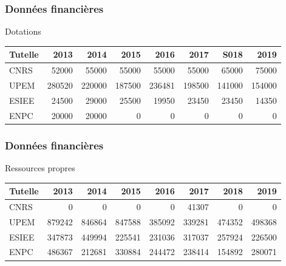 \documentclass[]{beamer}
\begin{document}
\begin{frame}
  \frametitle{Données financières}

  \begin{block}{Dotations}
    {\footnotesize
      \begin{center}
        \begin{tabular}{lrrrrrrr}
          \toprule
          Tutelle & 2013 &  2014 & 2015 & 2016 & 2017 & S018 & 2019 \\
          \midrule
          CNRS    & \num{52000}  & \num{55000}  & \num{55000}  & \num{55000}  & \num{55000}  & \num{65000}  & \num{75000}  \\
          UPEM    & \num{280520} & \num{220000} & \num{187500} & \num{236481} & \num{198500} & \num{141000} & \num{154000} \\
          ESIEE   & \num{24500}  & \num{29000}  & \num{25500}  & \num{19950}  & \num{23450}  & \num{23450}  & \num{14350}  \\
          ENPC    & \num{20000}  & \num{20000}  & \num{0}      & \num{0}      & \num{0}      & \num{0}      & \num{0}      \\
          \bottomrule
        \end{tabular}
      \end{center}
    }%
  \end{block}

\end{frame}


\begin{frame}
  \frametitle{Données financières}

  \begin{block}{Ressources propres}
    {\footnotesize
      \begin{center}
        \begin{tabular}{lrrrrrrr}
          \toprule
          Tutelle & 2013 &  2014 & 2015 & 2016 & 2017 & 2018 & 2019 \\
          \midrule
          CNRS    & \num{0}      & \num{0}      & \num{0}      & \num{0}      & \num{41307}  & \num{0} & \num{0} \\
          UPEM    & \num{879242} & \num{846864} & \num{847588} & \num{385092} & \num{339281} & \num{474352} & \num{498368} \\
          ESIEE   & \num{347873} & \num{449994} & \num{225541} & \num{231036} & \num{317037} & \num{257924} & \num{226500} \\
          ENPC    & \num{486367} & \num{212681} & \num{330884} & \num{244472} & \num{238414} & \num{154892} & \num{280071} \\
          \bottomrule
        \end{tabular}
      \end{center}
    }%
  \end{block}

\end{frame}


\end{document}
